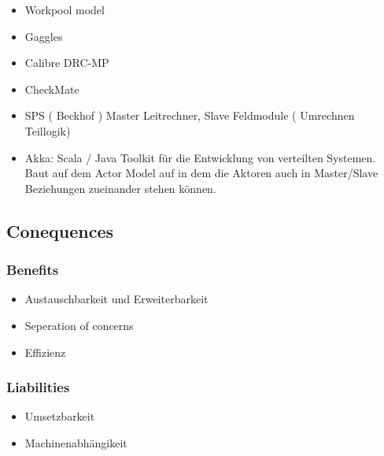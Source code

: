 \begin{itemize}
	\item Workpool model
	\item Gaggles
	\item Calibre DRC-MP
	\item CheckMate
	\item SPS ( Beckhof ) Master Leitrechner, Slave Feldmodule ( Umrechnen Teillogik)
	\item Akka: Scala / Java Toolkit für die Entwicklung von verteilten Systemen. Baut auf dem Actor Model auf in dem die Aktoren auch in Master/Slave Beziehungen zueinander stehen können.
\end{itemize}


\subsection*{Conequences}


\subsubsection*{Benefits}


\begin{itemize}
	\item Austauschbarkeit und Erweiterbarkeit
	\item Seperation of concerns
	\item Effizienz
\end{itemize}

\subsubsection*{Liabilities}


\begin{itemize}
	\item Umsetzbarkeit
	\item Machinenabhängikeit
\end{itemize}